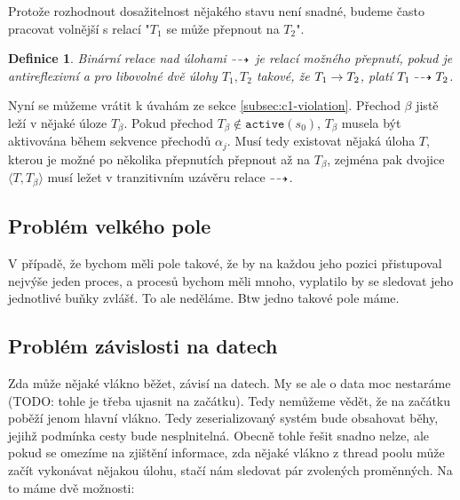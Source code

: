 \documentclass[10pt,a4paper,notitlepage]{report}
\newtheorem{definition}{Definice}
\newcommand{\tuple}[1]{\langle #1 \rangle}
\begin{document}
Protože rozhodnout dosažitelnost nějakého stavu není snadné, budeme často pracovat volnější s relací "$T_1$ se může přepnout na $T_2$".

\begin{definition}
Binární relace nad úlohami $\dashrightarrow$ je relací možného přepnutí, pokud je antireflexivní a pro libovolné dvě úlohy $T_1, T_2$ takové, že $T_1 \rightarrow T_2$, platí $T_1 \dashrightarrow T_2$.
\end{definition}

Nyní se můžeme vrátit k úvahám ze sekce \ref{subsec:c1-violation}. Přechod $\beta$ jistě leží v nějaké úloze $T_{\beta}$. Pokud přechod $T_{\beta} \not \in \texttt{active}(s_0)$, $T_{\beta}$ musela být aktivována během sekvence přechodů $\alpha_j$. Musí tedy existovat nějaká úloha $T$, kterou je možné po několika přepnutích přepnout až na $T_{\beta}$, zejména pak dvojice $\tuple{T, T_{\beta}}$ musí ležet v tranzitivním uzávěru relace $\dashrightarrow$.




\subsection{Problém velkého pole}
V případě, že bychom měli pole takové, že by na každou jeho pozici přistupoval nejvýše jeden proces,
a procesů bychom měli mnoho, vyplatilo by se sledovat jeho jednotlivé buňky zvlášť. To ale neděláme. Btw jedno takové pole máme.

\subsection{Problém závislosti na datech}
Zda může nějaké vlákno běžet, závisí na datech. My se ale o data moc nestaráme (TODO: tohle je třeba ujasnit na začátku). Tedy nemůžeme vědět, že na začátku poběží jenom hlavní vlákno. Tedy zeserializovaný systém bude obsahovat běhy, jejihž podmínka cesty bude nesplnitelná. Obecně tohle řešit snadno nelze, ale pokud se omezíme na zjištění informace, zda nějaké vlákno z thread poolu může začít vykonávat nějakou úlohu, stačí nám sledovat pár zvolených proměnných. Na to máme dvě možnosti:
\end{document}
